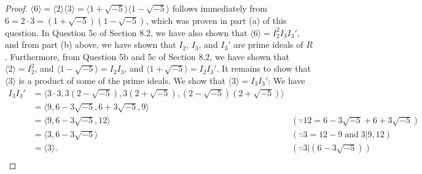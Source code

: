 \documentclass{article}
\begin{document}
\begin{enumerate}[label={\bf(\alph*)}]
      \begin{proof}
        $\langle6\rangle=\langle2\rangle\langle3\rangle
        =\langle1+\sqrt{-5}\rangle\langle1-\sqrt{-5}\rangle$ follows
        immediately from $6=2\cdot3=(1+\sqrt{-5})(1-\sqrt{-5})$, which was
        proven in part (a) of this question. In Question 5c of Section 8.2,
        we have also shown that $\langle6\rangle =I_2^2I_3I_3'$, and from
        part (b) above, we have shown that $I_2$, $I_3$, and $I_3'$ are
        prime ideals of $R$. Furthermore, from Question 5b and 5c of
        Section 8.2, we have shown that $\langle2\rangle =I_2^2$, and
        $\langle1-\sqrt{-5}\rangle=I_2I_3$, and
        $\langle1+\sqrt{-5}\rangle=I_2I_3'$. It remains to show that
        $\langle3\rangle$ is a product of some of the prime ideals. We show
        that $\langle3\rangle=I_3I_3'$: We have
        \begin{align*}
          I_3I_3' &=\langle 3\cdot3, 3(2-\sqrt{-5}), 3(2+\sqrt{-5}),
            (2-\sqrt{-5})(2+\sqrt{-5}) \rangle
            \\
            &=\langle9, 6-3\sqrt{-5}, 6+3\sqrt{-5}, 9 \rangle \\
            &=\langle9, 6-3\sqrt{-5}, 12 \rangle
              &(\because12=6-3\sqrt{-5}+6+3\sqrt{-5}) \\
            &=\langle3, 6-3\sqrt{-5} \rangle
              &(\because3=12-9\; \text{and}\; 3|9,12) \\
            &=\langle3\rangle.
              &(\because3|(6-3\sqrt{-5})) \\
        \end{align*}
      \end{proof}
  \end{enumerate}
\end{document}
